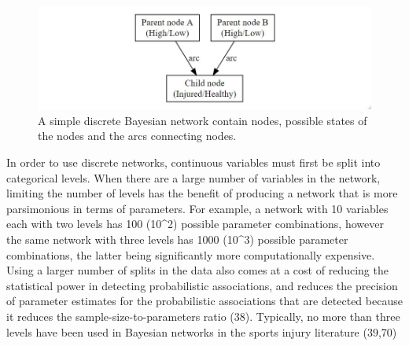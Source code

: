 \documentclass[
  english,
  man]{apa6}
\begin{document}
\begin{figure}[H]

{\centering \includegraphics[width=1\linewidth]{figures_doc/Fig5} 

}

\caption{A simple discrete Bayesian network contain nodes, possible states of the nodes and the arcs connecting nodes.}\label{fig:fig5}
\end{figure}

In order to use discrete networks, continuous variables must first be split into categorical levels.
When there are a large number of variables in the network, limiting the number of levels has the benefit of producing a network that is more parsimonious in terms of parameters. For example, a network with 10 variables each with two levels has 100 (10\^{}2) possible parameter combinations, however the same network with three levels has 1000 (10\^{}3) possible parameter combinations, the latter being significantly more computationally expensive. Using a larger number of splits in the data also comes at a cost of reducing the statistical power in detecting probabilistic associations, and reduces the precision of parameter estimates for the probabilistic associations that are detected because it reduces the sample-size-to-parameters ratio (38). Typically, no more than three levels have been used in Bayesian networks in the sports injury literature (39,70)
\end{document}
